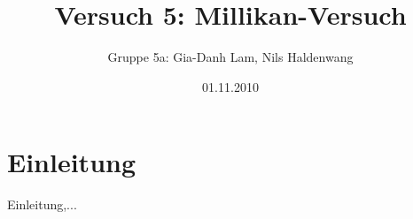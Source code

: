 \documentclass{scrartcl}
\begin{document}
\title{Versuch 5: Millikan-Versuch}


\date{01.11.2010}


\author{Gruppe 5a: Gia-Danh Lam, Nils Haldenwang}

\maketitle
\tableofcontents

\section{Einleitung}
Einleitung,...
\end{document}
